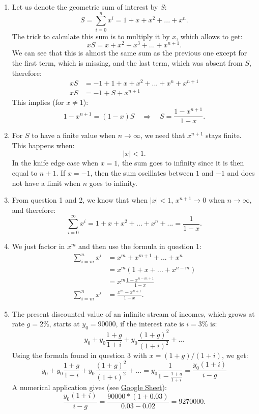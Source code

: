 \documentclass[]{book}
\begin{document}
\begin{enumerate}
\def\labelenumi{\arabic{enumi}.}
\item
  Let us denote the geometric sum of interest by \(S\):
  \[S=\sum_{i=0}^n x^i = 1+x+x^2+...+x^n.\] The trick to calculate this
  sum is to multiply it by \(x\), which allows to get:
  \[xS=x+x^2+x^3+...+x^{n+1}.\] We can see that this is almost the same
  sum as the previous one except for the first term, which is missing,
  and the last term, which was absent from \(S\), therefore:
  \[\begin{aligned}
  xS&=-1+1+x+x^2+...+x^n+x^{n+1}\\
  xS&=-1+S+x^{n+1}
  \end{aligned}\] This implies (for \(x\neq1\)):
  \[1-x^{n+1}=(1-x)S \quad \Rightarrow \quad S=\frac{1-x^{n+1}}{1-x}.\]
\item
  For \(S\) to have a finite value when \(n \to \infty\), we need that
  \(x^{n+1}\) stays finite. This happens when: \[\lvert x\rvert<1.\] In
  the knife edge case when \(x=1\), the sum goes to infinity since it is
  then equal to \(n+1\). If \(x=-1\), then the sum oscillates between
  \(1\) and \(-1\) and does not have a limit when \(n\) goes to
  infinity.
\item
  From question 1 and 2, we know that when \(\lvert x\rvert<1\),
  \(x^{n+1} \to 0\) when \(n \to \infty\), and therefore:
  \[\sum_{i=0}^{\infty} x^i = 1+x+x^2+...+x^n+...=\frac{1}{1-x}.\]
\item
  We just factor in \(x^m\) and then use the formula in question 1:
  \[\begin{aligned}
  \sum_{i=m}^n x^i &= x^m+x^{m+1}+...+x^n\\
  &=x^m\left(1+x+...+x^{n-m}\right)\\
  &=x^m\frac{1-x^{n-m+1}}{1-x}\\
  \sum_{i=m}^n x^i &=\frac{x^m - x^{n+1}}{1-x}.
  \end{aligned}\]
\item
  The present discounted value of an infinite stream of incomes, which
  grows at rate \(g=2\)\%, starts at \(y_0=90000\), if the interest rate
  is \(i=3\)\% is:
  \[y_0+y_0\frac{1+g}{1+i}+y_0\frac{(1+g)^2}{(1+i)^2} + ...\] Using the
  formula found in question 3 with \(x=(1+g)/(1+i)\), we get:
  \[y_0+y_0\frac{1+g}{1+i}+y_0\frac{(1+g)^2}{(1+i)^2} + ...=y_0\dfrac{1}{1-\frac{1+g}{1+i}}=\frac{y_0(1+i)}{i-g}\]
  A numerical application gives (see
  \href{https://docs.google.com/spreadsheets/d/108I8xuosIQvgU6wOGrfwzHhE4p1OStgv8iIpzZ-4vME/edit?usp=sharing}{Google
  Sheet}):
  \[\frac{y_0(1+i)}{i-g}=\frac{90000 *(1+0.03)}{0.03-0.02}=9270000.\]
\end{enumerate}
\end{document}
